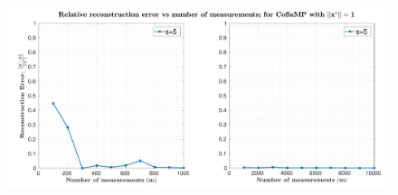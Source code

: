\begin{figure}[t]
	\begin{center}
		\includegraphics[width=\linewidth]{./fig/plot-1-1.pdf}
	\end{center}
	\caption{}
	\label{fig:plot-1-1}
\end{figure}

